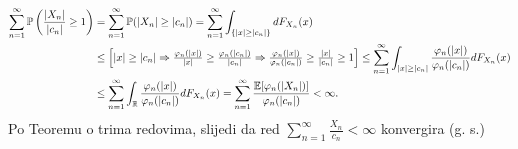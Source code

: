 \documentclass{article}
\begin{document}
\[\begin{aligned}\sum_{n=1}^\infty\Bbb P\left(\frac{|X_n|}{|c_n|}\ge1\right)&=\sum_{n=1}^\infty\Bbb P(|X_n|\ge|c_n|)=\sum_{n=1}^\infty\int_{\{|x|\ge|c_n|\}}dF_{X_n}(x)\\&\le\begin{bmatrix}|x|\ge|c_n|\Rightarrow\frac{\varphi_n(|x|)}{|x|}\ge\frac{\varphi_n(|c_n|)}{|c_n|}\Rightarrow\frac{\varphi_n(|x|)}{\varphi_n(|c_n|)}\ge\frac{|x|}{|c_n|}\ge 1\end{bmatrix}\le\sum_{n=1}^\infty\int_{|x|\ge|c_n|}\frac{\varphi_n(|x|)}{\varphi_n(|c_n|)}dF_{X_n}(x)\\&\le\sum_{n=1}^\infty\int_\Bbb R\frac{\varphi_n(|x|)}{\varphi_n(|c_n|)}dF_{X_n}(x)=\sum_{n=1}^\infty\frac{\Bbb E[\varphi_n(|X_n|)]}{\varphi_n(|c_n|)}<\infty.\end{aligned}\] Po Teoremu o trima redovima, slijedi da red \(\displaystyle\sum_{n=1}^\infty\frac{X_n}{c_n}<\infty\) konvergira (g. s.)
\newpage
\end{document}
